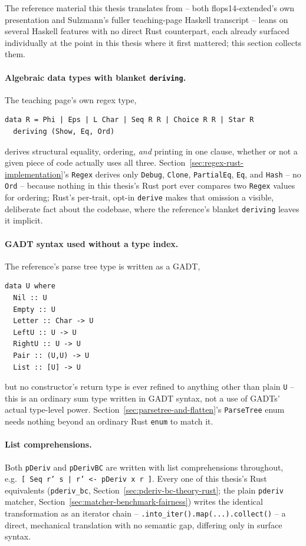 The reference material this thesis translates from -- both
flops14-extended's own presentation \citep{sulzmannlu2014} and
Sulzmann's fuller teaching-page Haskell transcript \citep{sulzmann_slides}
-- leans on several Haskell features with no direct Rust counterpart,
each already surfaced individually at the point in this thesis where it
first mattered; this section collects them.

\paragraph{Algebraic data types with blanket \texttt{deriving}.} The
teaching page's own regex type,
\begin{verbatim}
data R = Phi | Eps | L Char | Seq R R | Choice R R | Star R
  deriving (Show, Eq, Ord)
\end{verbatim}
derives structural equality, ordering, \emph{and} printing in one clause,
whether or not a given piece of code actually uses all three. Section~\ref{sec:regex-rust-implementation}'s
\texttt{Regex} derives only \texttt{Debug}, \texttt{Clone},
\texttt{PartialEq}, \texttt{Eq}, and \texttt{Hash} -- no \texttt{Ord} --
because nothing in this thesis's Rust port ever compares two
\texttt{Regex} values for ordering; Rust's per-trait, opt-in
\texttt{derive} makes that omission a visible, deliberate fact about the
codebase, where the reference's blanket \texttt{deriving} leaves it
implicit.

\paragraph{GADT syntax used without a type index.} The reference's parse
tree type is written as a GADT,
\begin{verbatim}
data U where
  Nil :: U
  Empty :: U
  Letter :: Char -> U
  LeftU :: U -> U
  RightU :: U -> U
  Pair :: (U,U) -> U
  List :: [U] -> U
\end{verbatim}
but no constructor's return type is ever refined to anything other than
plain \texttt{U} -- this is an ordinary sum type written in GADT syntax,
not a use of GADTs' actual type-level power. Section~\ref{sec:parsetree-and-flatten}'s
\texttt{ParseTree} enum needs nothing beyond an ordinary Rust
\texttt{enum} to match it.

\paragraph{List comprehensions.} Both \texttt{pDeriv} and \texttt{pDerivBC}
are written with list comprehensions throughout, e.g.\
\texttt{[ Seq r' s | r' <- pDeriv x r ]}. Every one of this thesis's Rust
equivalents (\texttt{pderiv\_bc}, Section~\ref{sec:pderiv-bc-theory-rust};
the plain \texttt{pderiv} matcher, Section~\ref{sec:matcher-benchmark-fairness})
writes the identical transformation as an iterator chain --
\texttt{.into\_iter().map(...).collect()} -- a direct, mechanical
translation with no semantic gap, differing only in surface syntax.

